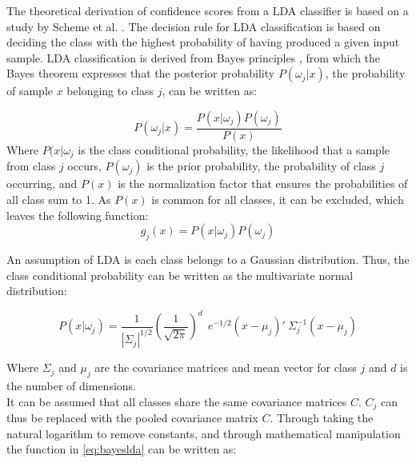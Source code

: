  
The theoretical derivation of confidence scores from a LDA classifier is based on a study by Scheme et al. \cite{Scheme2013}. The decision rule for LDA classification is based on deciding the class with the highest probability of having produced a given input sample. LDA classification is derived from Bayes principles \cite{Scheme2013a}, from which the Bayes theorem expresses that the posterior probability $P(\omega_{j}|x)$, the probability of sample $x$ belonging to class $j$, can be written as:

\vspace{-1cm}

\begin{equation}
	P(\omega_{j}|x) = \frac{P(x|\omega_{j})P(\omega_{j})}{P(x)}
\end{equation}
\vspace{-0.2cm}
Where $P(x|\omega_{j}$ is the class conditional probability, the likelihood that a sample from class $j$ occurs, $P(\omega_{j})$ is the prior probability, the probability of class $j$ occurring, and $P(x)$ is the normalization factor that ensures the probabilities of all class sum to 1. As $P(x)$ is common for all classes, it can be excluded, which leaves the following function:
\vspace{-0.2cm}
\begin{equation} \label{eq:bayeslda}
	g_{j}(x) = P(x|\omega_{j})P(\omega_{j})
\end{equation} 

An assumption of LDA is each class belongs to a Gaussian distribution. Thus, the class conditional probability can be written as the multivariate normal distribution:
 
\begin{equation}
P(x|\omega_{j}) = \frac{1}{|\varSigma_{j}|^{1/2}}(\frac{1}{\sqrt{2\pi}})^{d} ~~e^{-1/2} (x-\mu_{j})' ~\varSigma^{-1}_{j} (x-\mu_{j})
\end{equation} 

Where $\varSigma_{j}$ and $\mu_{j}$ are the covariance matrices and mean vector for class $j$ and $d$ is the number of dimensions. \\
It can be assumed that all classes share the same covariance matrices $C$. $C_{j}$ can thus be replaced with the pooled covariance matrix $C$. Through taking the natural logarithm to remove constants, and through mathematical manipulation the function in \eqref{eq:bayeslda} can be written as:

